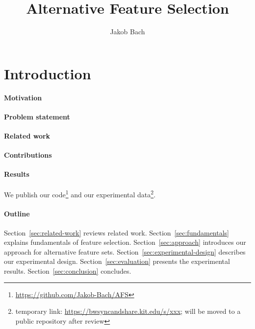 \documentclass{article}
\title{Alternative Feature Selection}
\author{Jakob Bach}
\begin{document}
\maketitle

\begin{abstract}
\end{abstract}

\section{Introduction}
\label{sec:introduction}

\paragraph{Motivation}

\paragraph{Problem statement}

\paragraph{Related work}

\paragraph{Contributions}

\paragraph{Results}

We publish our code\footnote{\url{https://github.com/Jakob-Bach/AFS}} and our experimental data\footnote{temporary link: \url{https://bwsyncandshare.kit.edu/s/xxx}; will be moved to a public repository after review}.

\paragraph{Outline}

Section~\ref{sec:related-work} reviews related work.
Section~\ref{sec:fundamentals} explains fundamentals of feature selection.
Section~\ref{sec:approach} introduces our approach for alternative feature sets.
Section~\ref{sec:experimental-design} describes our experimental design.
Section~\ref{sec:evaluation} presents the experimental results.
Section~\ref{sec:conclusion} concludes.
\end{document}
